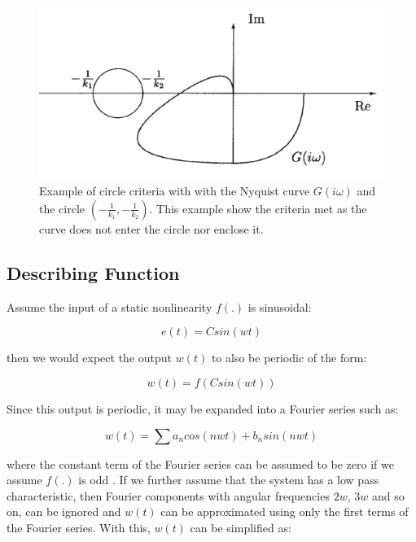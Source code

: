 \documentclass[a4paper, titlepage]{article}
\begin{document}
\begin{figure}[h!]
\center
\includegraphics[scale=1]{../figures/circleExample.png}
\caption{Example of circle criteria with with the Nyquist curve $G(i\omega)$ and the circle $\left(-\frac{1}{k_1}, -\frac{1}{k_2}\right)$. This example show the criteria met as the curve does not enter the circle nor enclose it. \citep[~p.333]{glad00}}
\label{fig:cirEx}
\end{figure}



\subsection{Describing Function}
Assume the input of a static nonlinearity $f(.)$ is sinusoidal:

\begin{equation}
	e(t) = Csin(wt)
	\label{equ:input_e}
\end{equation}

then we would expect the output $w(t)$ to also be periodic of the form:

\begin{equation}
	w(t) = f(Csin(wt))
\end{equation}

Since this output is periodic, it may be expanded into a Fourier series such as:

\begin{equation}
	w(t) = \sum{a_{n}cos(nwt)+b_{n}sin(nwt)}
\end{equation}

where the constant term of the Fourier series can be assumed to be zero if we assume $f(.)$ is odd \citep[p. 358]{glad00}.  If we further assume that the system has a low pass characteristic, then Fourier components with angular frequencies $2w$, $3w$ and so on, can be ignored and $w(t)$ can be approximated using only the first terms of the Fourier series.  With this, $w(t)$ can be simplified as:
\end{document}
